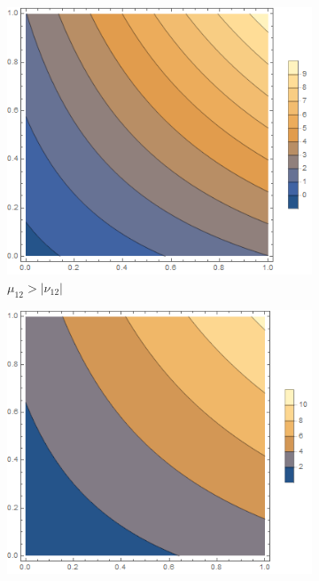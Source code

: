 \documentclass[12pt,a4]{article}
\begin{document}
\begin{figure}[!ht]
	\begin{subfigure}[b]{0.3\textwidth}
		\centering
		\includegraphics[width=\textwidth]{Joonised/PhiMu11Mu22I}
		\caption{$ \mu_{12} > |\nu_{12}| $}
	\end{subfigure}
	\hfill
	\begin{subfigure}[b]{0.3\textwidth}
		\centering
		\includegraphics[width=\textwidth]{Joonised/PhiMu11Mu22II}

\end{subfigure}
\end{figure}
\end{document}
